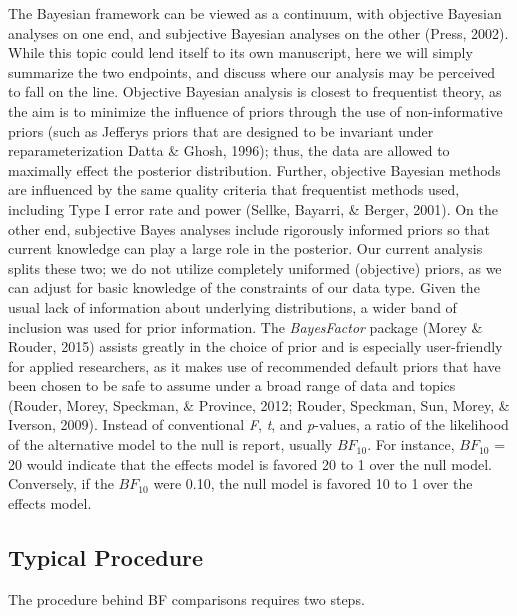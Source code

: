 \documentclass[english,mask,man]{apa6}
\theoremstyle{definition}
\theoremstyle{definition}
\theoremstyle{definition}
\theoremstyle{remark}
\begin{document}
The Bayesian framework can be viewed as a continuum, with objective
Bayesian analyses on one end, and subjective Bayesian analyses on the
other (Press, 2002). While this topic could lend itself to its own
manuscript, here we will simply summarize the two endpoints, and discuss
where our analysis may be perceived to fall on the line. Objective
Bayesian analysis is closest to frequentist theory, as the aim is to
minimize the influence of priors through the use of non-informative
priors (such as Jefferys priors that are designed to be invariant under
reparameterization Datta \& Ghosh, 1996); thus, the data are allowed to
maximally effect the posterior distribution. Further, objective Bayesian
methods are influenced by the same quality criteria that frequentist
methods used, including Type I error rate and power (Sellke, Bayarri, \&
Berger, 2001). On the other end, subjective Bayes analyses include
rigorously informed priors so that current knowledge can play a large
role in the posterior. Our current analysis splits these two; we do not
utilize completely uniformed (objective) priors, as we can adjust for
basic knowledge of the constraints of our data type. Given the usual
lack of information about underlying distributions, a wider band of
inclusion was used for prior information. The \emph{BayesFactor} package
(Morey \& Rouder, 2015) assists greatly in the choice of prior and is
especially user-friendly for applied researchers, as it makes use of
recommended default priors that have been chosen to be safe to assume
under a broad range of data and topics (Rouder, Morey, Speckman, \&
Province, 2012; Rouder, Speckman, Sun, Morey, \& Iverson, 2009). Instead
of conventional \emph{F}, \emph{t}, and \emph{p}-values, a ratio of the
likelihood of the alternative model to the null is report, usually
\(BF_{10}\). For instance, \(BF_{10}\) = 20 would indicate that the
effects model is favored 20 to 1 over the null model. Conversely, if the
\(BF_{10}\) were 0.10, the null model is favored 10 to 1 over the
effects model.

\subsection{Typical Procedure}\label{typical-procedure}

The procedure behind BF comparisons requires two steps.
\end{document}
